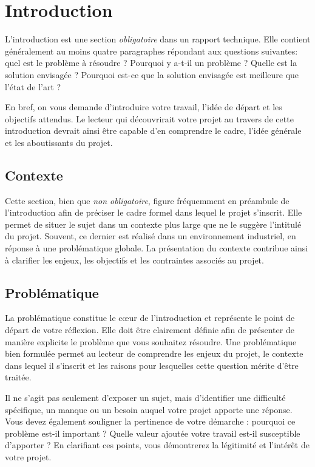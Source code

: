 \chapter{Introduction}

L'introduction est une section \emph{obligatoire} dans un rapport technique. Elle contient généralement au moins quatre paragraphes répondant aux questions suivantes: quel est le problème à résoudre ? Pourquoi y a-t-il un problème ? Quelle est la solution envisagée ? Pourquoi est-ce que la solution envisagée est meilleure que l'état de l'art ?

En bref, on vous demande d'introduire votre travail, l'idée de départ et les objectifs attendus. Le lecteur qui découvrirait votre projet au travers de cette introduction devrait ainsi être capable d'en comprendre le cadre, l'idée générale et les aboutissants du projet.

\section{Contexte}

Cette section, bien que \emph{non obligatoire}, figure fréquemment en préambule de l'introduction afin de préciser le cadre formel dans lequel le projet s'inscrit. Elle permet de situer le sujet dans un contexte plus large que ne le suggère l'intitulé du projet. Souvent, ce dernier est réalisé dans un environnement industriel, en réponse à une problématique globale. La présentation du contexte contribue ainsi à clarifier les enjeux, les objectifs et les contraintes associés au projet.

\section{Problématique}

La problématique constitue le cœur de l'introduction et représente le point de départ de votre réflexion. Elle doit être clairement définie afin de présenter de manière explicite le problème que vous souhaitez résoudre. Une problématique bien formulée permet au lecteur de comprendre les enjeux du projet, le contexte dans lequel il s'inscrit et les raisons pour lesquelles cette question mérite d'être traitée.

Il ne s'agit pas seulement d'exposer un sujet, mais d'identifier une difficulté spécifique, un manque ou un besoin auquel votre projet apporte une réponse. Vous devez également souligner la pertinence de votre démarche : pourquoi ce problème est-il important ? Quelle valeur ajoutée votre travail est-il susceptible d'apporter ? En clarifiant ces points, vous démontrerez la légitimité et l'intérêt de votre projet.


